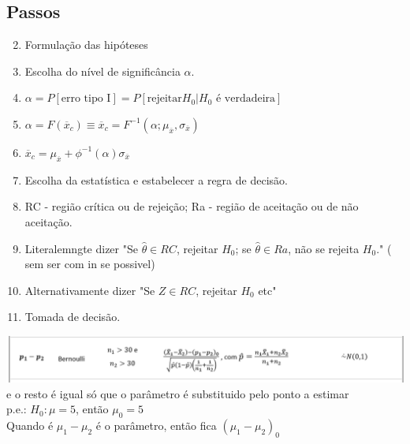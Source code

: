 \documentclass[a4paper]{article}
\newcommand{\estimador}{\hat{\theta}}
\begin{document}
\begin{multicols}{3}
\subsection{Passos}
\begin{enumerate}
  \setcounter{enumi}{1}
  \item Formulação das hipóteses
  \item Escolha do nível de significância $\alpha$.
  \item[] $\alpha = P[\text{erro tipo I}] = P[\text{rejeitar} H_0 | H_0 \text{ é verdadeira}]$
  \item[] $\alpha = F(\overline{x}_c) \equiv \overline{x}_c = F^{-1}(\alpha; \mu_{\overline{x}}, \sigma_{\overline{x}})$
  \item[] $\overline{x}_c = \mu_{\overline{x}} + \phi^{-1}(\alpha)\sigma_{\overline{x}}$
  \item Escolha da estatística e estabelecer a regra de decisão.
  \item[] RC - região crítica ou de rejeição; Ra - região de aceitação ou de não aceitação.
  \item[] Literalemngte dizer "Se $\estimador \in RC$, rejeitar $H_0$; se $\estimador \in Ra$,  não se rejeita $H_0$." ( sem ser com in se possivel)
  \item[] Alternativamente dizer "Se $Z \in RC$, rejeitar $H_0$ etc"
  \item Tomada de decisão.
\end{enumerate}
\includegraphics[width=\columnwidth]{table3.png}
e o resto é igual só que o parâmetro é substituido pelo ponto a estimar \\
p.e.: $H_0: \mu = 5$, então $\mu_0 = 5$ \\
Quando é $\mu_1 - \mu_2$ é o parâmetro, então fica $(\mu_1 - \mu_2)_0$ \\
\end{multicols}
\end{document}
